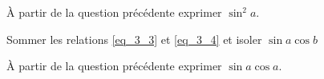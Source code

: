 		




\begin{enonce}
	À partir de la question précédente exprimer $\sin^2 a$.
	\end{enonce}
	
	
		



\begin{enonce}
	Sommer les relations \eqref{eq_3_3} et \eqref{eq_3_4} et isoler $\sin a \cos b$
	\end{enonce}
	
	
		



\begin{enonce}
	À partir de la question précédente exprimer $\sin a \cos a$.
	\end{enonce}
	
	
		



